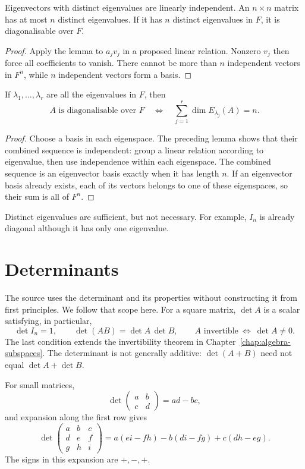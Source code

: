\begin{corollary}
Eigenvectors with distinct eigenvalues are linearly independent.
An $n\times n$ matrix has at most $n$ distinct eigenvalues.
If it has $n$ distinct eigenvalues in $F$, it is diagonalisable over $F$.
\end{corollary}
\begin{proof}
Apply the lemma to $a_jv_j$ in a proposed linear relation.
Nonzero $v_j$ then force all coefficients to vanish.
There cannot be more than $n$ independent vectors in $F^n$, while
$n$ independent vectors form a basis.
\end{proof}

\begin{theorem}
If $\lambda_1,\ldots,\lambda_r$ are all the eigenvalues in $F$, then
\[
 A\text{ is diagonalisable over }F
 \quad\Longleftrightarrow\quad
 \sum_{j=1}^r\dim E_{\lambda_j}(A)=n.
\]
\end{theorem}
\begin{proof}
Choose a basis in each eigenspace. The preceding lemma shows that their
combined sequence is independent: group a linear relation according to
eigenvalue, then use independence within each eigenspace.
The combined sequence is an eigenvector basis exactly when it has
length $n$. If an eigenvector basis already exists, each of its vectors
belongs to one of these eigenspaces, so their sum is all of $F^n$.
\end{proof}

Distinct eigenvalues are sufficient, but not necessary.
For example, $I_n$ is already diagonal although it has only one
eigenvalue.

\section{Determinants}

The source uses the determinant and its properties without constructing
it from first principles. We follow that scope here.
For a square matrix, $\det A$ is a scalar satisfying, in particular,
\[
 \det I_n=1,\qquad \det(AB)=\det A\,\det B,\qquad
 A\text{ invertible}\ \Longleftrightarrow\ \det A\ne0.
\]
The last condition extends the invertibility theorem in
Chapter~\ref{chap:algebra-subspaces}.
The determinant is not generally additive: $\det(A+B)$ need not equal
$\det A+\det B$.

For small matrices,
\[
 \det\begin{pmatrix}a&b\\c&d\end{pmatrix}=ad-bc,
\]
and expansion along the first row gives
\[
 \det\begin{pmatrix}a&b&c\\d&e&f\\g&h&i\end{pmatrix}
 =a(ei-fh)-b(di-fg)+c(dh-eg).
\]
The signs in this expansion are $+,-,+$.

